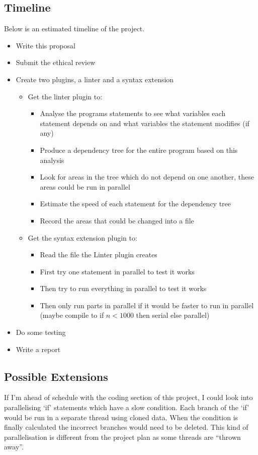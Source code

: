 \documentclass[12pt, a4paper]{article}
\begin{document}
\subsection{Timeline}

Below is an estimated timeline of the project.

\begin{itemize}
	\item Write this proposal
	\item Submit the ethical review
	\item Create two plugins, a linter and a syntax extension
	\begin{itemize}
		\item Get the linter plugin to:
		\begin{itemize}
			\item Analyse the programs statements to see what variables each statement depends on and what variables the statement modifies (if any)
			\item Produce a dependency tree for the entire program based on this analysis
			\item Look for areas in the tree which do not depend on one another, these areas could be run in parallel
			\item Estimate the speed of each statement for the dependency tree
			\item Record the areas that could be changed into a file
		\end{itemize}
		\item Get the syntax extension plugin to:
		\begin{itemize}
			\item Read the file the Linter plugin creates
			\item First try one statement in parallel to test it works
			\item Then try to run everything in parallel to test it works
			\item Then only run parts in parallel if it would be faster to run in parallel (maybe compile to if $n < 1000$ then serial else parallel)
		\end{itemize}
	\end{itemize}
	\item Do some testing
	\item Write a report
\end{itemize}

\subsection{Possible Extensions}
If I'm ahead of schedule with the coding section of this project, I could look into parallelising `if' statements which have a slow condition. Each branch of the `if' would be run in a separate thread using cloned data. When the condition is finally calculated the incorrect branches would need to be deleted. This kind of parallelisation is different from the project plan as some threads are ``thrown away''.
\end{document}
